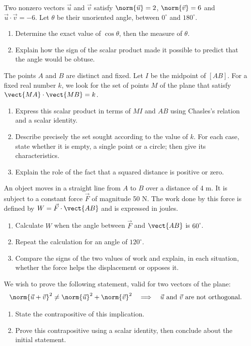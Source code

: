 Two nonzero vectors $\vec u$ and $\vec v$ satisfy $\norm{\vec u}=2$, $\norm{\vec v}=6$ and $\vec u\cdot\vec v=-6$. Let $\theta$ be their unoriented angle, between $0^\circ$ and $180^\circ$.
\begin{enumerate}[label=\arabic*.]
\item Determine the exact value of $\cos\theta$, then the measure of $\theta$.
\item Explain how the sign of the scalar product made it possible to predict that the angle would be obtuse.
\end{enumerate}
The points $A$ and $B$ are distinct and fixed. Let $I$ be the midpoint of $[AB]$. For a fixed real number $k$, we look for the set of points $M$ of the plane that satisfy $\vect{MA}\cdot\vect{MB}=k$.
\begin{enumerate}[label=\arabic*.]
\item Express this scalar product in terms of $MI$ and $AB$ using Chasles's relation and a scalar identity.
\item Describe precisely the set sought according to the value of $k$. For each case, state whether it is empty, a single point or a circle; then give its characteristics.
\item Explain the role of the fact that a squared distance is positive or zero.
\end{enumerate}
An object moves in a straight line from $A$ to $B$ over a distance of 4 m. It is subject to a constant force $\vec F$ of magnitude 50 N. The work done by this force is defined by $W=\vec F\cdot\vect{AB}$ and is expressed in joules.
\begin{enumerate}[label=\arabic*.]
\item Calculate $W$ when the angle between $\vec F$ and $\vect{AB}$ is $60^\circ$.
\item Repeat the calculation for an angle of $120^\circ$.
\item Compare the signs of the two values of work and explain, in each situation, whether the force helps the displacement or opposes it.
\end{enumerate}
We wish to prove the following statement, valid for two vectors of the plane:\[\norm{\vec u+\vec v}^2\ne\norm{\vec u}^2+\norm{\vec v}^2\quad\Longrightarrow\quad \vec u\text{ and }\vec v\text{ are not orthogonal}.\]
\begin{enumerate}[label=\arabic*.]
\item State the contrapositive of this implication.
\item Prove this contrapositive using a scalar identity, then conclude about the initial statement.
\end{enumerate}

